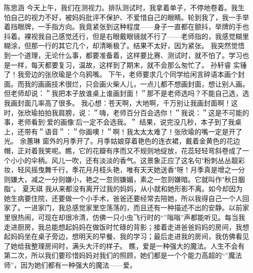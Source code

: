 \markdownRendererDocumentBegin
{}\markdownRendererInterblockSeparator
{}\markdownRendererInterblockSeparator
{}陈思涵\markdownRendererInterblockSeparator
{}今天上午，我们在测视力。排队测试时，我拿着单子，不停地卷着。我生怕自己的视力不好，被妈妈批评不保护、不爱惜自己的眼睛。轮到我了，我一手举着挡眼牌，一手指方向。我竟紧张到这种程度——身子一直都在颤抖，举牌的手也抖着。裸视我自己感觉还行，但是右眼戴眼镜就不行了——老师指的，我感觉糊里糊涂，但那一行的其它几个，却清晰极了。结果不太好，因为紧张。\markdownRendererInterblockSeparator
{}我突然觉悟到一个道理，无论什么事，都要准备着，这样要比赛、测试时，就不怕了。学习也是一样，每天都要复习，温故，这样到了期末，就不会那么匆忙了。\markdownRendererInterblockSeparator
{}\markdownRendererInterblockSeparator
{}孙轩睿\markdownRendererInterblockSeparator
{}实锤了！我旁边的张欣瑜是个乌鸦嘴。\markdownRendererInterblockSeparator
{}下午，老师要求几个同学给闲言碎语本画个封面。而我的画画技术很烂，只会画火柴人儿，一点儿都不想画封面，想让别人画。但老师却说：＂我把本子放谁桌上谁画封面！＂那不是老师选吗？不能自己选，选我画封面几率高了很多。\markdownRendererInterblockSeparator
{}我心想：苍天啊，大地啊，千万别让我画封面啊！这时，张欣瑜拍拍我肩膀，说：＂嗨，老师百分百会选你！＂我说：＂这是不可能的事，老师看到‘爱的画像’后一定不会选我。＂\markdownRendererInterblockSeparator
{}结果，说完没几秒，本子到了我桌上，还带有＂语音＂：＂你画噢！＂啊！我太太太难了！张欣瑜的嘴一定是开了光。\markdownRendererInterblockSeparator
{}\markdownRendererInterblockSeparator
{}余蕙琳\markdownRendererInterblockSeparator
{}窗外的月季开了。月季姑娘穿着艳色的连衣裙，戴着金黄色的花边帽，正对着我笑呢。瞧，它的花瓣有序而又不规则地绽放，花蕊轻轻弯斜卷成了一个小小的伞柄。风儿一吹，还有淡淡的香气。这景象正应了这名句"粉刺丛丛靓彩妆，轻风摇曳舞千行，季花月月枝头艳，唯有天天她送香"呀！月季真是增之一分则嫌大，减之一分则嫌小，艳之一忽则嫌媚，素之一忽则嫌暗。它就叫作"秋日胭脂"。\markdownRendererInterblockSeparator
{}\markdownRendererInterblockSeparator
{}夏天祺\markdownRendererInterblockSeparator
{}我从来都没有离开过我的妈妈，从小就和她形影不离。如今却因为她生病要住院，还要做一个小手术，爸爸还要经常去陪她，所以我得自己一个人回家了。一进家门，我总感觉家里空荡荡的，而且还有一种描述不出的安静。以前家里很热闹，可现在却很冷清，仿佛一只小虫飞行时的“”嗡嗡”声都能听见。每当我走进厨房，我总能想起妈妈在做饭时忙碌的背影；接着走进爸爸妈妈的房间，我想起妈妈坐在桌子旁边，想明天的早餐、我的学习；最后走进我的房间，我仿佛看见了她给我整理房间时，满头大汗的样子。 瞧，爱是一种强大的魔法。人生不会有第二次，所以我们要珍惜妈妈对我们的照顾，她们都是一个个能力高超的“”魔法师”，因为她们都有一种强大的魔法——爱。\markdownRendererInterblockSeparator
